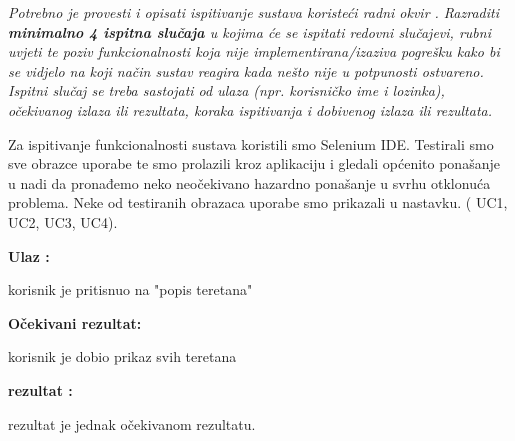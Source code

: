 			 \textit{Potrebno je provesti i opisati ispitivanje sustava koristeći radni okvir . Razraditi \textbf{minimalno 4 ispitna slučaja} u kojima će se ispitati redovni slučajevi, rubni uvjeti te poziv funkcionalnosti koja nije implementirana/izaziva pogrešku kako bi se vidjelo na koji način sustav reagira kada nešto nije u potpunosti ostvareno. Ispitni slučaj se treba sastojati od ulaza (npr. korisničko ime i lozinka), očekivanog izlaza ili rezultata, koraka ispitivanja i dobivenog izlaza ili rezultata.\\ }
			 
		
		 	 Za ispitivanje funkcionalnosti sustava koristili smo Selenium IDE. Testirali smo
		 	 sve obrazce uporabe te smo prolazili kroz aplikaciju i gledali općenito ponašanje
		 	 u nadi da pronađemo neko neočekivano hazardno ponašanje u svrhu otklonuća problema.
		 	 Neke od testiranih obrazaca uporabe smo prikazali u nastavku. ( UC1, UC2, UC3, UC4).
		 	 
		 	 
	
	            \noindent {}
                \begin{packed_item}
						\item  \textbf{Ulaz : } 
						\item[] \begin{packed_enum}
	
							\item korisnik je pritisnuo na "popis teretana"

						\end{packed_enum}
						\item  \textbf{Očekivani rezultat: } 
						\item[] \begin{packed_enum}
	
							\item korisnik je dobio prikaz svih teretana

						\end{packed_enum}
						
						\item  \textbf{rezultat : }
						\item[] \begin{packed_enum}
	
							\item rezultat je jednak očekivanom rezultatu.

						\end{packed_enum}

				\end{packed_item}
				
